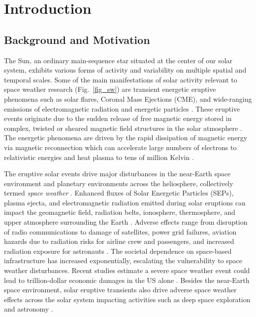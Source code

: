 \chapter{Introduction}
\label{chapter1}

\section{Background and Motivation}
The Sun, an ordinary main-sequence star situated at the center of our solar system, exhibits various forms of activity and variability on multiple spatial and temporal scales. Some of the main manifestations of solar activity relevant to space weather research (Fig.~\ref{fig_sw}) are transient energetic eruptive phenomena such as solar flares, Coronal Mass Ejections (CME), and wide-ranging emissions of electromagnetic radiation and energetic particles \citep{schwenn_2006, pulkkinen_2007}. These eruptive events originate due to the sudden release of free magnetic energy stored in complex, twisted or sheared magnetic field structures in the solar atmosphere \citep{moore_2001, priest_forbes_2007, zhang_2012, amari_2014}. The energetic phenomena are driven by the rapid dissipation of magnetic energy via magnetic reconnection which can accelerate large numbers of electrons to relativistic energies and heat plasma to tens of million Kelvin \citep{shibata_2011, benz_2017}.

The eruptive solar events drive major disturbances in the near-Earth space environment and planetary environments across the heliosphere, collectively termed \textit{space weather} \citep{schrijver_2010, eastwood_2017}. Enhanced fluxes of Solar Energetic Particles (SEPs), plasma ejecta, and electromagnetic radiation emitted during solar eruptions can impact the geomagnetic field, radiation belts, ionosphere, thermosphere, and upper atmosphere surrounding the Earth \citep{schwenn_2006, pulkkinen_2007}. Adverse effects range from disruption of radio communications to damage of satellites, power grid failures, aviation hazards due to radiation risks for airline crew and passengers, and increased radiation exposure for astronauts \citep{lanzerotti_2001}. The societal dependence on space-based infrastructure has increased exponentially, escalating the vulnerability to space weather disturbances. Recent studies estimate a severe space weather event could lead to trillion-dollar economic damages in the US alone \citep{oughton_2017}. Besides the near-Earth space environment, solar eruptive transients also drive adverse space weather effects across the solar system impacting activities such as deep space exploration and astronomy \citep{lilensten_2014}.


